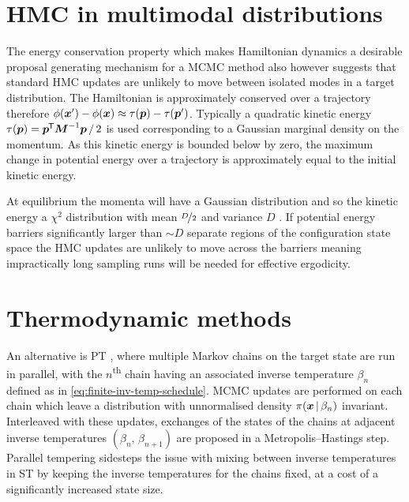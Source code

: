 \section{HMC in multimodal distributions}

The energy conservation property which makes Hamiltonian dynamics a desirable proposal generating mechanism for a \ac{MCMC} method also however suggests that standard \ac{HMC} updates are unlikely to move between isolated modes in a target distribution. The Hamiltonian is approximately conserved over a trajectory therefore $\phi(\boldsymbol{x}') - \phi(\boldsymbol{x}) \approx \tau(\boldsymbol{p}) - \tau(\boldsymbol{p}')$. Typically a quadratic kinetic energy  $\tau(\boldsymbol{p}) = \boldsymbol{p}^{\mkern-1.5mu\mathsf{T}}\boldsymbol{M}^{-1}\boldsymbol{p} \,/\,2$ is used corresponding to a Gaussian marginal density on the momentum. As this kinetic energy is bounded below by zero, the maximum change in potential energy over a trajectory is approximately equal to the initial kinetic energy. 

At equilibrium the momenta will have a Gaussian distribution and so the kinetic energy a $\chi^2$ distribution with mean $\nicefrac{D}{2}$ and variance $D$ \citep{neal2011mcmc,betancourt2013general}. If potential energy barriers significantly larger than $\sim D$ separate regions of the configuration state space the \ac{HMC} updates are unlikely to move across the barriers meaning impractically long sampling runs will be needed for effective ergodicity.

\section{Thermodynamic methods}

An alternative is \ac{PT} \citep{swendsen1986replica,geyer1991markov,earl2005parallel}, where multiple Markov chains on the target state are run in parallel, with the $n$\textsuperscript{th} chain having an associated inverse temperature $\beta_n$ defined as in \eqref{eq:finite-inv-temp-schedule}. \ac{MCMC} updates are performed on each chain which leave a distribution with unnormalised density $\pi(\boldsymbol{x} \operatorname{|} \beta_n)$ invariant. Interleaved with these updates, exchanges of the states of the chains at adjacent inverse temperatures $(\beta_n,\,\beta_{n+1})$ are proposed in a Metropolis--Hastings step. Parallel tempering sidesteps the issue with mixing between inverse temperatures in \ac{ST} by keeping the inverse temperatures for the chains fixed, at a cost of a significantly increased state size.

